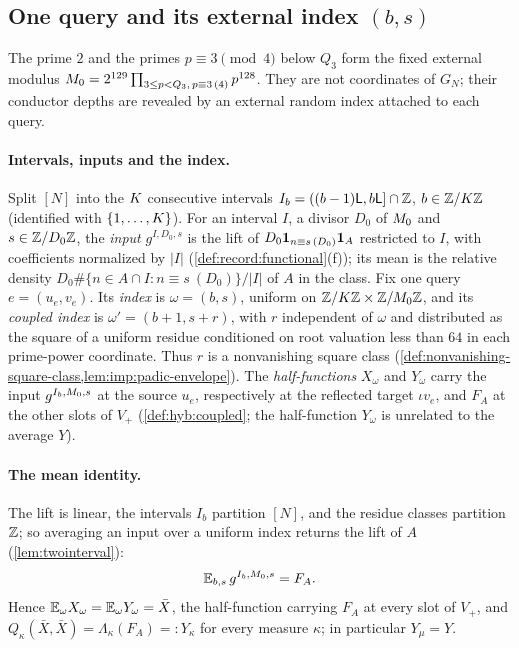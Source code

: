 \subsection{One query and its external index \texorpdfstring{$(b,s)$}{(b,s)}}\label{subsec:mech:index}

The prime $2$ and the primes $p\equiv3\pmod4$ below $Q_3$ form the fixed
external modulus
$M_0=2^{129}\prod_{3\le p<Q_3,\,p\equiv3\,(4)}p^{128}$.
They are not coordinates of $G_N$; their conductor depths are revealed
by an external random index attached to each query.

\paragraph{Intervals, inputs and the index.}
Split $[N]$ into the $K$ consecutive intervals $I_b=((b-1)\mathsf L,b\mathsf L]\cap\mathbb Z$,
$b\in\mathbb Z/K\mathbb Z$ (identified with $\{1,\dots,K\}$). For an interval $I$, a
divisor $D_0$ of $M_0$ and $s\in\mathbb Z/D_0\mathbb Z$, the \emph{input} $g^{I,D_0,s}$ is
the lift of $D_0\mathbf 1_{n\equiv s\,(D_0)}\mathbf 1_A$ restricted to $I$, with
coefficients normalized by $|I|$ (\cref{def:record:functional}(f)); its mean
is the relative density $D_0\#\{n\in A\cap I:n\equiv s\ (D_0)\}/|I|$ of $A$ in
the class. Fix one query $e=(u_e,v_e)$. Its \emph{index} is $\omega=(b,s)$,
uniform on $\mathbb Z/K\mathbb Z\times\mathbb Z/M_0\mathbb Z$, and its \emph{coupled index} is
$\omega'=(b+1,s+r)$, with $r$ independent of $\omega$ and distributed
as the square of a uniform residue conditioned on root valuation less than
$64$ in each prime-power coordinate. Thus $r$ is a nonvanishing square
class (\cref{def:nonvanishing-square-class,lem:imp:padic-envelope}). The
\emph{half-functions} $X_\omega$ and $Y_\omega$ carry the input $g^{I_b,M_0,s}$ at
the source $u_e$, respectively at the reflected target $\iota v_e$, and $F_A$
at the other slots of $V_+$ (\cref{def:hyb:coupled}; the half-function
$Y_\omega$ is unrelated to the average $Y$).

\paragraph{The mean identity.}
The lift is linear, the intervals $I_b$ partition $[N]$, and the residue
classes partition $\mathbb Z$; so averaging an input over a uniform index returns
the lift of $A$ (\cref{lem:twointerval}):
\begin{equation}\label{eq:mech:mean}
 \mathbb E_{b,s}\,g^{I_b,M_0,s}=F_A .
\end{equation}
Hence $\mathbb E_\omega X_\omega=\mathbb E_\omega Y_\omega=\bar X$, the half-function carrying $F_A$ at
every slot of $V_+$, and $Q_\kappa(\bar X,\bar X)=\Lambda_\kappa(F_A)=:Y_\kappa$ for every
measure $\kappa$; in particular $Y_\mu=Y$.

